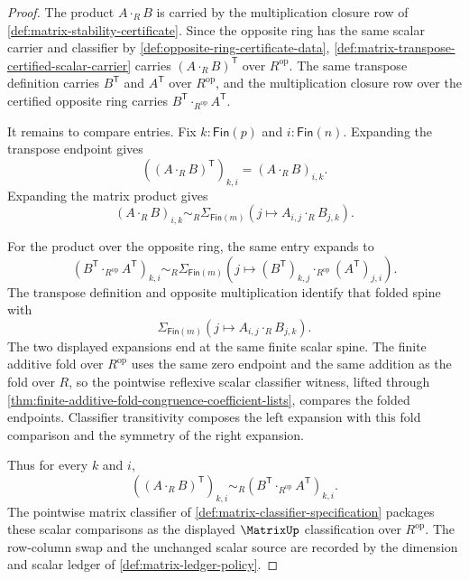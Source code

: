 \begin{proof}
The product $A\cdot_RB$ is carried by the multiplication closure row of \autoref{def:matrix-stability-certificate}. Since the opposite ring has the same scalar carrier and classifier by \autoref{def:opposite-ring-certificate-data}, \autoref{def:matrix-transpose-certified-scalar-carrier} carries $(A\cdot_RB)^{\mathsf{T}}$ over $R^{\mathrm{op}}$. The same transpose definition carries $B^{\mathsf{T}}$ and $A^{\mathsf{T}}$ over $R^{\mathrm{op}}$, and the multiplication closure row over the certified opposite ring carries $B^{\mathsf{T}}\cdot_{R^{\mathrm{op}}}A^{\mathsf{T}}$.

It remains to compare entries. Fix $k:\mathsf{Fin}(p)$ and $i:\mathsf{Fin}(n)$. Expanding the transpose endpoint gives
$$
((A\cdot_RB)^{\mathsf{T}})_{k,i}
=
(A\cdot_RB)_{i,k}.
$$
Expanding the matrix product gives
$$
(A\cdot_RB)_{i,k}
\sim_R
\Sigma_{\mathsf{Fin}(m)}(j\mapsto A_{i,j}\cdot_RB_{j,k}).
$$

For the product over the opposite ring, the same entry expands to
$$
(B^{\mathsf{T}}\cdot_{R^{\mathrm{op}}}A^{\mathsf{T}})_{k,i}
\sim_R
\Sigma_{\mathsf{Fin}(m)}(j\mapsto (B^{\mathsf{T}})_{k,j}\cdot_{R^{\mathrm{op}}}(A^{\mathsf{T}})_{j,i}).
$$
The transpose definition and opposite multiplication identify that folded spine
with
$$
\Sigma_{\mathsf{Fin}(m)}(j\mapsto A_{i,j}\cdot_RB_{j,k}).
$$
The two displayed expansions end at the same finite scalar spine. The finite additive fold over $R^{\mathrm{op}}$ uses the same zero endpoint and the same addition as the fold over $R$, so the pointwise reflexive scalar classifier witness, lifted through \autoref{thm:finite-additive-fold-congruence-coefficient-lists}, compares the folded endpoints. Classifier transitivity composes the left expansion with this fold comparison and the symmetry of the right expansion.

Thus for every $k$ and $i$,
$$
((A\cdot_RB)^{\mathsf{T}})_{k,i}
\sim_R
(B^{\mathsf{T}}\cdot_{R^{\mathrm{op}}}A^{\mathsf{T}})_{k,i}.
$$
The pointwise matrix classifier of \autoref{def:matrix-classifier-specification} packages these scalar comparisons as the displayed $\MatrixUp$ classification over $R^{\mathrm{op}}$. The row-column swap and the unchanged scalar source are recorded by the dimension and scalar ledger of \autoref{def:matrix-ledger-policy}.
\end{proof}
